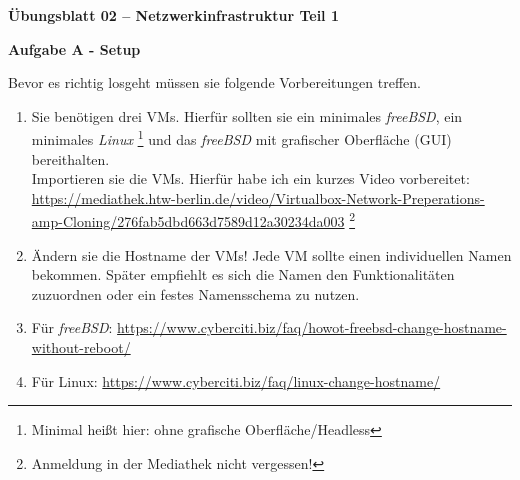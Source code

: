 \documentclass[paper=a4,fontsize=11pt]{scrartcl}%
\begin{document}
\begin{center}
\Large{\textbf{Übungsblatt 02 -- Netzwerkinfrastruktur Teil 1}}\\
\end{center}

\begin{center}\Large{\textbf{Aufgabe A - Setup}}\end{center}
Bevor es richtig losgeht müssen sie folgende Vorbereitungen treffen.
\begin{enumerate}
	\item Sie benötigen drei VMs. Hierfür sollten sie ein minimales \emph{freeBSD}, ein minimales \emph{Linux} \footnote{Minimal heißt hier: ohne grafische Oberfläche/Headless} und das \emph{freeBSD} mit grafischer Oberfläche (GUI) bereithalten. \\
Importieren sie die VMs. Hierfür habe ich ein kurzes Video vorbereitet: \url{https://mediathek.htw-berlin.de/video/Virtualbox-Network-Preperations-amp-Cloning/276fab5dbd663d7589d12a30234da003} \footnote{Anmeldung in der Mediathek nicht vergessen!}
	\item Ändern sie die Hostname der VMs! Jede VM sollte einen individuellen Namen bekommen. Später empfiehlt es sich die Namen den Funktionalitäten zuzuordnen oder ein festes Namensschema zu nutzen. 
	 \item Für \emph{freeBSD}: \url{https://www.cyberciti.biz/faq/howot-freebsd-change-hostname-without-reboot/}
	 \item Für Linux: \url{https://www.cyberciti.biz/faq/linux-change-hostname/}
\end{enumerate}
	
\end{document}
